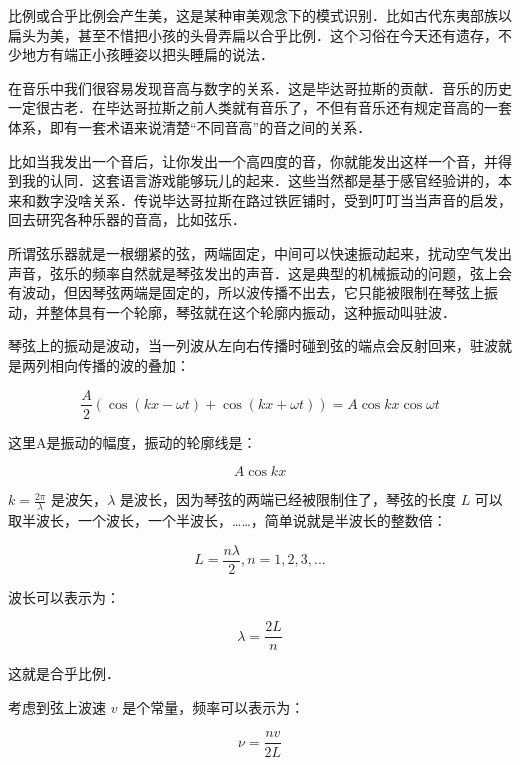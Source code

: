 比例或合乎比例会产生美，这是某种审美观念下的模式识别．比如古代东夷部族以扁头为美，甚至不惜把小孩的头骨弄扁以合乎比例．这个习俗在今天还有遗存，不少地方有端正小孩睡姿以把头睡扁的说法．

在音乐中我们很容易发现音高与数字的关系．这是毕达哥拉斯的贡献．音乐的历史一定很古老．在毕达哥拉斯之前人类就有音乐了，不但有音乐还有规定音高的一套体系，即有一套术语来说清楚“不同音高”的音之间的关系．

比如当我发出一个音后，让你发出一个高四度的音，你就能发出这样一个音，并得到我的认同．这套语言游戏能够玩儿的起来．这些当然都是基于感官经验讲的，本来和数字没啥关系．传说毕达哥拉斯在路过铁匠铺时，受到叮叮当当声音的启发，回去研究各种乐器的音高，比如弦乐．

所谓弦乐器就是一根绷紧的弦，两端固定，中间可以快速振动起来，扰动空气发出声音，弦乐的频率自然就是琴弦发出的声音．这是典型的机械振动的问题，弦上会有波动，但因琴弦两端是固定的，所以波传播不出去，它只能被限制在琴弦上振动，并整体具有一个轮廓，琴弦就在这个轮廓内振动，这种振动叫驻波．

琴弦上的振动是波动，当一列波从左向右传播时碰到弦的端点会反射回来，驻波就是两列相向传播的波的叠加：

\begin{equation}
\frac{A}{2} \left( \cos ( kx - \omega t ) + \cos ( kx + \omega t ) \right) = A \cos kx \cos \omega t
\end{equation}

这里A是振动的幅度，振动的轮廓线是：

\begin{equation}
A \cos kx 
\end{equation}

$k = \frac{2 \pi}{\lambda}$ 是波矢，$\lambda$ 是波长，因为琴弦的两端已经被限制住了，琴弦的长度 $L$ 可以取半波长，一个波长，一个半波长，……，简单说就是半波长的整数倍：

\begin{equation}
L = \frac{n \lambda}{2}, n = 1, 2, 3, ...
\end{equation}

波长可以表示为：

\begin{equation}
\lambda = \frac{2L}{n}
\end{equation}

这就是合乎比例．

考虑到弦上波速 $v$ 是个常量，频率可以表示为：

\begin{equation}
\nu = \frac{n v}{2 L }
\end{equation}

